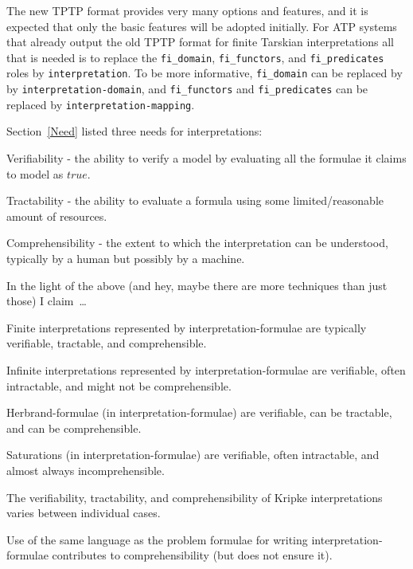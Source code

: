 \documentclass{easychair}
\newenvironment{packed_itemize}{
\vspace*{-0.3em}
\begin{itemize}
\setlength{\partopsep}{0pt}
\setlength{\itemsep}{1pt}
\setlength{\parskip}{0pt}
\setlength{\parsep}{0pt}
}{\end{itemize}}
\begin{document}
The new TPTP format provides very many options and features, and it is expected that only the 
basic features will be adopted initially. 
For ATP systems that already output the old TPTP format for finite Tarskian interpretations
all that is needed is to replace the {\tt fi\_domain}, {\tt fi\_functors}, and {\tt fi\_predicates}
roles by {\tt interpretation}. 
To be more informative, {\tt fi\_domain} can be replaced by by {\tt interpretation-domain}, and 
{\tt fi\_functors} and {\tt fi\_predicates} can be replaced by {\tt interpretation-mapping}.

Section~\ref{Need} listed three needs for interpretations: 
\begin{packed_itemize}
\item Verifiability - the ability to verify a model by evaluating all the formulae it claims
      to model as $true$.
\item Tractability - the ability to evaluate a formula using some limited/reasonable amount of
      resources.
\item Comprehensibility - the extent to which the interpretation can be understood, typically
      by a human but possibly by a machine.
\end{packed_itemize}

In the light of the above (and hey, maybe there are more techniques than just those) I claim~\ldots
\begin{packed_itemize}
\item Finite interpretations represented by interpretation-formulae are typically verifiable, 
      tractable, and comprehensible.
\item Infinite interpretations represented by interpretation-formulae are verifiable, often 
      intractable, and might not be comprehensible.
\item Herbrand-formulae (in interpretation-formulae) are verifiable, can be tractable, and can 
      be comprehensible.
\item Saturations (in interpretation-formulae) are verifiable, often intractable, and almost 
      always incomprehensible.
\item The verifiability, tractability, and comprehensibility of Kripke interpretations varies
      between individual cases.
\item Use of the same language as the problem formulae for writing interpretation-formulae
      contributes to comprehensibility (but does not ensure it).
\end{packed_itemize}
\end{document}
